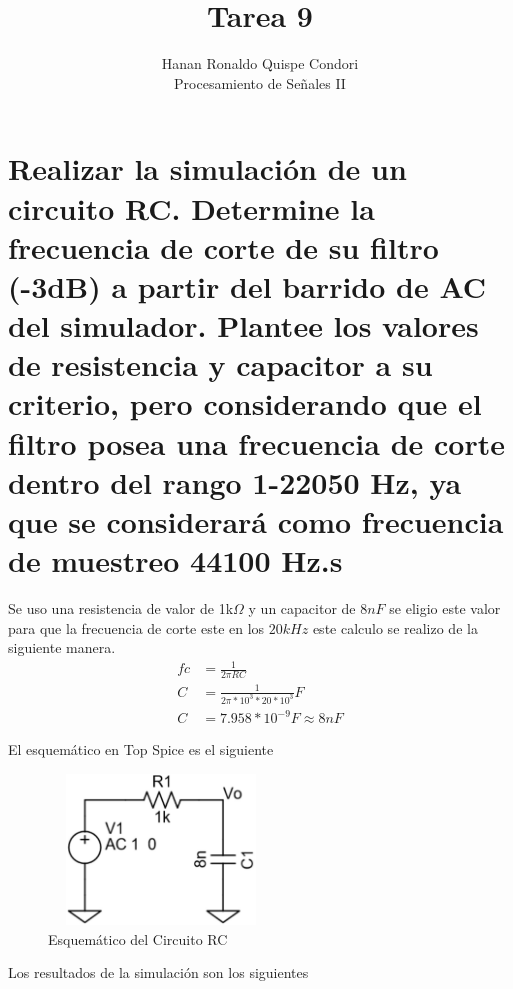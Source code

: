 \documentclass[12pt]{article}
\begin{document}
\title{Tarea 9}
\author{Hanan Ronaldo Quispe Condori\\ %
Procesamiento de Señales II}

\maketitle
\section{Realizar la simulación de un circuito RC. Determine la frecuencia de corte de su filtro (-3dB) a partir del barrido de AC del simulador. Plantee los valores de resistencia y capacitor a su criterio, pero considerando que el filtro posea una frecuencia de corte dentro del rango 1-22050 Hz, ya que se considerará como frecuencia de muestreo 44100 Hz.s}
Se uso una resistencia de valor de 1k$\Omega$ y un capacitor de $8nF$ se eligio este valor para que la frecuencia de corte este en los $20kHz$ este calculo se realizo de la siguiente manera.
\begin{equation}
    \begin{split}
        fc&=\frac{1}{2\pi RC}\\
        C&=\frac{1}{2\pi*10^3*20*10^3}F\\
        C&=7.958*10^{-9}F\approx 8nF
    \end{split}
    \label{eq:corte}
\end{equation}

El esquemático en Top Spice es el siguiente
\begin{figure}[h]
    \centering
    \includegraphics[width=6cm,height=4cm]{imagenes/esquematico}
    \caption{Esquemático del Circuito RC}
    \label{fig:esquematico}
\end{figure}

Los resultados de la simulación son los siguientes 
\end{document}
